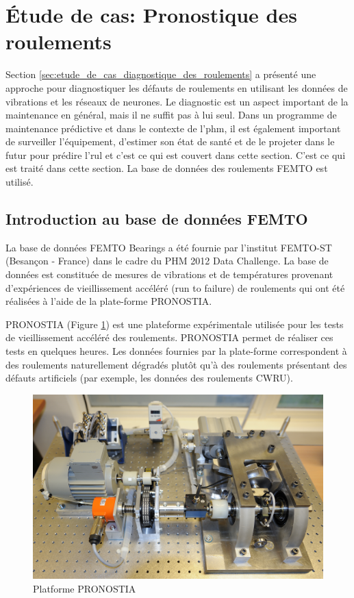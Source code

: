 \section{Étude de cas: Pronostique des roulements}%
\label{sec:etude_de_cas_pronostique_des_roulements}
Section \ref{sec:etude_de_cas_diagnostique_des_roulements} a présenté une approche pour diagnostiquer les défauts de roulements en utilisant les données de vibrations et les réseaux de neurones. Le diagnostic est un aspect important de la maintenance en général, mais il ne suffit pas à lui seul. Dans un programme de maintenance prédictive et dans le contexte de l'\acrshort{phm}, il est également important de surveiller l'équipement, d'estimer son état de santé et de le projeter dans le futur pour prédire l'\acrshort{rul} et c'est ce qui est couvert dans cette section. C'est ce qui est traité dans cette section. La base de données des roulements FEMTO est utilisé.


\subsection{Introduction au base de données FEMTO}%
\label{sub:introduction_au_base_de_donnees_femto}

La base de données FEMTO Bearings a été fournie par l'institut FEMTO-ST (Besançon - France) dans le cadre du PHM 2012 Data Challenge. La base de données est constituée de mesures de vibrations et de températures provenant d'expériences de vieillissement accéléré (run to failure) de roulements qui ont été réalisées à l'aide de la plate-forme PRONOSTIA.

PRONOSTIA (Figure \ref{fig:pronostia-platform}) est une plateforme expérimentale utilisée pour les tests de vieillissement accéléré des roulements. PRONOSTIA permet de réaliser ces tests en quelques heures. Les données fournies par la plate-forme correspondent à des roulements naturellement dégradés plutôt qu'à des roulements présentant des défauts artificiels (par exemple, les données des roulements CWRU).

\begin{figure}[h]
	\centering
	\includegraphics[width=.8\linewidth]{figures/pronostia.jpg}
	\caption{Platforme PRONOSTIA \cite{pronostia}}%
	\label{fig:pronostia-platform}
\end{figure}

